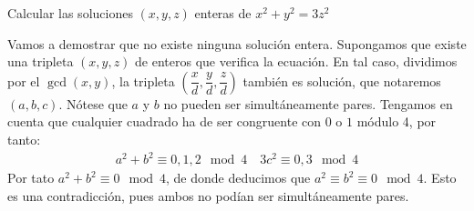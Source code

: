 \documentclass[twoside]{article}
\begin{document}
\newpage
\begin{ejercicio}{3}
Calcular las soluciones $(x,y,z)$ enteras de $x^2+y^2=3z^2$
\begin{solucion}
Vamos a demostrar que no existe ninguna solución entera. Supongamos que existe una tripleta $(x,y,z)$ de enteros que verifica la ecuación. En tal caso, dividimos por el $\gcd(x,y)$, la tripleta $\left(\dfrac{x}{d},\dfrac{y}{d},\dfrac{z}{d}\right)$ también es solución, que notaremos $(a,b,c)$. Nótese que $a$ y $b$ no pueden ser simultáneamente pares. Tengamos en cuenta que cualquier cuadrado ha de ser congruente con $0$ o $1$ módulo 4, por tanto:
\begin{align*}
a^2+b^2 \equiv 0,1,2 \mod 4 \quad 3c^2 \equiv 0, 3 \mod 4
\end{align*}
Por tato $a^2+b^2 \equiv 0 \mod 4$, de donde deducimos que $a^2 \equiv b^2 \equiv 0 \mod 4$. Esto es una contradicción, pues ambos no podían ser simultáneamente pares.
\end{solucion}
\end{ejercicio}
\end{document}
